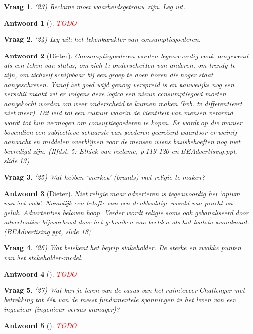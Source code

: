 \documentclass{article}
\theoremstyle{nonumberplain}
\newtheorem{question}{Vraag}
\newtheorem{answer}{Antwoord}
\begin{document}
\begin{question}
(23)	Reclame moet waarheidsgetrouw zijn. Leg uit.
\end{question}
\begin{answer}[]
\textcolor{red}{TODO}%
\end{answer}

\begin{question}
(24)	Leg uit: het tekenkarakter van consumptiegoederen. 
\end{question}
\begin{answer}[Dieter]
	Consumptiegoederen worden tegenwoordig vaak aangewend als een teken van status, om zich te onderscheiden van anderen, om trendy te zijn, om zichzelf schijnbaar bij een groep te doen horen die hoger staat aangeschreven.
	Vanaf het goed wijd genoeg verspreid is en nauwelijks nog een verschil maakt zal er volgens deze logica een nieuw consumptiegoed moeten aangekocht worden om weer onderscheid te kunnen maken (bvb. tv differentieert niet meer).
	Dit leid tot een cultuur waarin de identiteit van mensen verarmd wordt tot hun vermogen om consuptiegoederen te kopen.
	Er wordt op die manier bovendien een subjectieve schaarste van goederen gecre\"eerd waardoor er weinig aandacht en middelen overblijven voor de mensen wiens basisbehoeften nog niet bevredigd zijn. 
	\textit{(Hfdst. 5: Ethiek van reclame, p.119-120 en BEAdvertising.ppt, slide 13)}
\end{answer}

\begin{question}
(25)	Wat hebben `merken' (brands) met religie te maken? 
\end{question}
\begin{answer}[Dieter]
	Niet religie maar adverteren is tegenwoordig het `opium van het volk'. Namelijk een belofte van een denkbeeldige wereld van pracht en geluk. Advertenties beloven hoop. Verder wordt religie soms ook gebanaliseerd door advertenties bijvoorbeeld door het gebruiken van beelden als het laatste avondmaal. \textit{(BEAdvertising.ppt, slide 18)}
\end{answer}

\begin{question}
(26)	Wat betekent het begrip stakeholder. De sterke en zwakke punten van het stakeholder-model.
\end{question}
\begin{answer}[]
\textcolor{red}{TODO}%
\end{answer}

\begin{question}
(27)	Wat kan je leren van de casus van het ruimteveer Challenger met betrekking tot \'e\'en van de meest fundamentele spanningen in het leven van een ingenieur (ingenieur versus manager)? 
\end{question}
\begin{answer}[]
\textcolor{red}{TODO}%
\end{answer}
\end{document}
